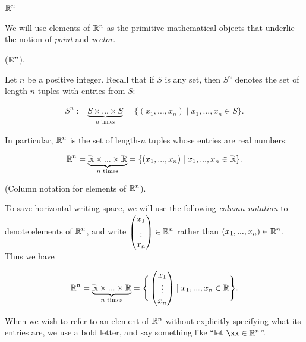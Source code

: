 \newpage

\subsection*{$\mathbb{R}^n$}

We will use elements of $\mathbb{R}^n$ as the primitive mathematical objects that underlie the notion of \textit{point} and \textit{vector}.

\begin{defn}
    ($\mathbb{R}^n$).
    
    Let $n$ be a positive integer. Recall that if $S$ is any set, then $S^n$ denotes the set of length-$n$ tuples with entries from $S$:
    
    \begin{align*}
        S^n := \underbrace{S \times ... \times S}_{\text{$n$ times}} = \{(x_1, ..., x_n) \mid x_1, ..., x_n \in S\}.
    \end{align*}
    
    In particular, $\mathbb{R}^n$ is the set of length-$n$ tuples whose entries are real numbers: 
    
    \begin{align*}
        \mathbb{R}^n = \underbrace{\mathbb{R} \times ... \times \mathbb{R}}_{\text{$n$ times}} = \{(x_1, ..., x_n) \mid x_1, ..., x_n \in \mathbb{R}\}.
    \end{align*}
\end{defn}

\begin{defn}
    (Column notation for elements of $\mathbb{R}^n$).
    
    To save horizontal writing space, we will use the following \textit{column notation} to denote elements of $\mathbb{R}^n$, and write $\begin{pmatrix} x_1 \\ \vdots \\ x_n \end{pmatrix} \in \mathbb{R}^n$ rather than $(x_1, ..., x_n) \in \mathbb{R}^n$. Thus we have
    
    \begin{align*}
        \mathbb{R}^n = \underbrace{\mathbb{R} \times ... \times \mathbb{R}}_{\text{$n$ times}} = \Bigg\{ \begin{pmatrix} x_1 \\ \vdots \\ x_n \end{pmatrix} \mid x_1, ..., x_n \in \mathbb{R} \Bigg\}.
    \end{align*}
    
    When we wish to refer to an element of $\mathbb{R}^n$ without explicitly specifying what its entries are, we use a bold letter, and say something like ``let $\xx \in \R^n$''.
\end{defn}

